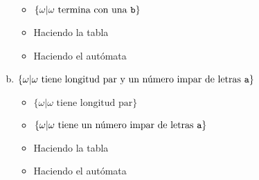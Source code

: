 \documentclass{article}
\begin{document}
\begin{enumerate}[a.]
\begin{itemize}
        \item $\{\omega|\omega\text{ termina con una \texttt{b}}\}$
        
        
        \item Haciendo la tabla
        
        
        \item Haciendo el autómata
        
    \end{itemize}    
    
    \item $\{\omega|\omega \text{ tiene longitud par y un número impar de letras \texttt{a}}\}$
    \begin{itemize}
        \item $\{\omega|\omega\text{ tiene longitud par}\}$
        
        
        \item $\{\omega|\omega\text{ tiene un número impar de letras \texttt{a}}\}$
        
        
        \item Haciendo la tabla
        
        
        \item Haciendo el autómata
        
    \end{itemize}    
    
\end{enumerate}
\end{document}
